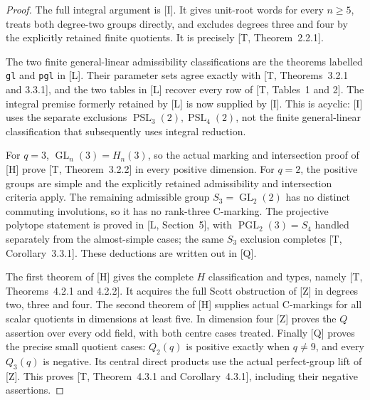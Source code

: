 \documentclass[11pt,a4paper]{article}
\newcommand{\GL}{\operatorname{GL}}
\newcommand{\PGL}{\operatorname{PGL}}
\newcommand{\PSL}{\operatorname{PSL}}
\begin{document}
\begin{proof}
The full integral argument is [I]. It gives unit-root words for
every $n\ge5$, treats both degree-two groups directly, and excludes
degrees three and four by the explicitly retained finite quotients.
It is precisely [T, Theorem~2.2.1].

The two finite general-linear admissibility classifications are the
theorems labelled \texttt{gl} and \texttt{pgl} in [L]. Their parameter
sets agree exactly with [T, Theorems~3.2.1 and 3.3.1], and the two
tables in [L] recover every row of [T, Tables~1 and 2]. The integral
premise formerly retained by [L] is now supplied by [I]. This is
acyclic: [I] uses the separate exclusions $\PSL_3(2),\PSL_4(2)$,
not the finite general-linear classification that subsequently
uses integral reduction.

For $q=3$, $\GL_n(3)=H_n(3)$, so the actual marking and
intersection proof of [H] prove [T, Theorem~3.2.2] in every positive
dimension. For $q=2$, the positive groups are simple and the
explicitly retained admissibility and intersection criteria apply.
The remaining admissible group $S_3=\GL_2(2)$ has no distinct
commuting involutions, so it has no rank-three C-marking. The
projective polytope statement is proved in [L, Section~5], with
$\PGL_2(3)=S_4$ handled separately from the almost-simple cases;
the same $S_3$ exclusion completes [T, Corollary~3.3.1]. These
deductions are written out in [Q].

The first theorem of [H] gives the complete $H$ classification and
types, namely [T, Theorems~4.2.1 and 4.2.2]. It acquires the full
Scott obstruction of [Z] in degrees two, three and four. The second
theorem of [H] supplies actual C-markings for all scalar quotients
in dimensions at least five. In dimension four [Z] proves the
$Q$ assertion over every odd field, with both centre cases treated.
Finally [Q] proves the precise small quotient cases: $Q_2(q)$ is
positive exactly when $q\ne9$, and every $Q_3(q)$ is negative.
Its central direct products use the actual perfect-group lift of
[Z]. This proves [T, Theorem~4.3.1 and Corollary~4.3.1], including
their negative assertions.
\end{proof}
\end{document}
